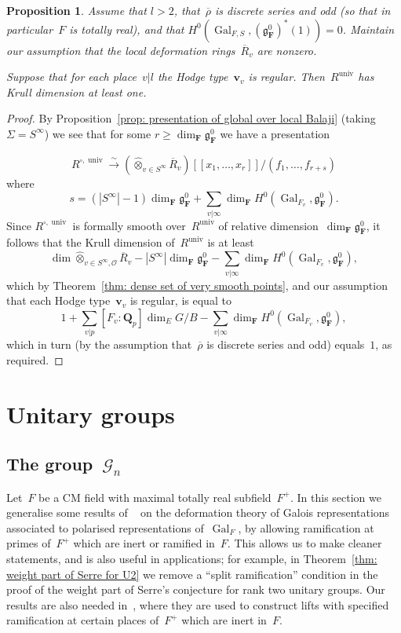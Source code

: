\documentclass{amsart}
\renewcommand{\mathbb}{\mathbf}
\newcommand{\Rbar}{\overline{R}}
\def\wotimes {\widehat{\otimes}}
\def\fg{\mathfrak{g}}
\newcommand{\univ}{{\operatorname{univ}}}
\newcommand{\To}{\longrightarrow}
\newcommand{\isoto}{\stackrel{\sim}{\To}}
\newtheorem{prop}[subsubsection]{Proposition}
\theoremstyle{definition}
\theoremstyle{remark}
\newcommand{\mar}[1]{}
\newcommand{\mar}[1]{\marginpar{\raggedright\tiny squirrel #1}}
\newcommand{\F}{\FF}
\newcommand{\Q}{\QQ}
\newcommand{\FF}{{\mathbb F}}
\newcommand{\QQ}{{\mathbb Q}}
\newcommand{\bv}{\ensuremath{\mathbf{v}}}
\newcommand{\cG}{{\mathcal G}}
\newcommand{\cO}{{\mathcal O}}
\newcommand{\Qp}{\Q_p}
\DeclareMathOperator{\Gal}{Gal}
\DeclareMathOperator{\rank}{rank}
\newcommand{\rhobar}{\overline{\rho}}
\begin{document}
\begin{prop}
  \label{prop: global deformation ring with types is positive
    dimensional}%
  Assume that $l>2$, that~$\rhobar$ is discrete series and odd
  \emph{(}so that in particular~$F$ is totally real\emph{)}, and that
  $H^0(\Gal_{F,S},(\fg_\F^0)^*(1))=0$. Maintain our assumption that
  the local deformation rings~$\Rbar_v$ are nonzero.

  Suppose that for each place~$v|l$ the Hodge type~$\bv_v$ is regular.
  Then~$R^\univ$ has Krull dimension at least one.
\end{prop}
\begin{proof} By Proposition~\ref{prop: presentation of global over
    local Balaji} (taking~$\Sigma=S^\infty$) we see that for some
  $r\ge \dim_\F\fg_{\F}^0$ we have a presentation

\[R^{\square,\univ}\isoto \left(\wotimes_{v\in S^\infty}\Rbar_v\right)[\![x_1,\dots,x_{r}]\!]/(f_1,\dots,f_{r+s})\]where
 \[s=(|S^\infty|-1)\dim_{\F}\fg_\F^0
    +\sum_{v|\infty}\dim_\F H^0(\Gal_{F_v},\fg_\F^0). \] Since  $R^{\square,\univ}$ is formally smooth over~$R^{\univ}$
  of relative dimension~$\dim_\F\fg_{\F}^0$, it follows that
  the Krull dimension of~$R^\univ$ is at least \[\dim \wotimes_{v\in S^\infty,\cO}\Rbar_v-|S^\infty|\dim_{\F}\fg_\F^0
    -\sum_{v|\infty}\dim_\F H^0(\Gal_{F_v},\fg_\F^0), \] which by
  Theorem~\ref{thm: dense set of very smooth points}, and our assumption that each Hodge type~$\bv_v$
  is regular, is equal to \[1+ \sum_{v|p}[F_v:\Qp]\dim_E G/B -\sum_{v|\infty}\dim_\F
    H^0(\Gal_{F_v},\fg_\F^0), \]which in turn (by the assumption
  that~$\rhobar$ is discrete series and odd) equals~$1$, as required.%
\end{proof}
\section{Unitary groups}\label{sec: unitary groups}
\subsection{The group~$\cG_n$}Let~$F$ be a CM field with maximal totally real
subfield~$F^+$. In this section we generalise some results of
~\cite{BLGGT} on the deformation theory of Galois representations
associated to polarised representations
of~$\Gal_F$, by allowing ramification at primes of~$F^+$ which are
inert or ramified in~$F$. This allows us to make cleaner statements,
and is also useful in applications; for example, in Theorem~\ref{thm:
  weight part of Serre for U2} we remove a ``split ramification''
condition in 
the proof of the weight part of Serre's conjecture for rank two unitary groups. Our
results are also needed in~\cite{CEGglobalrealisable}, where they are
used to construct lifts with specified ramification at certain places
of~$F^+$ which are inert in~$F$.
\end{document}
